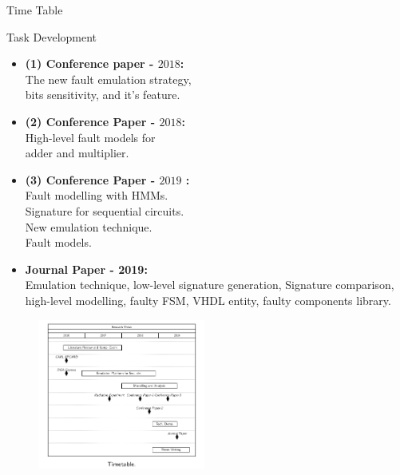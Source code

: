 \documentclass[aspectratio=1610]{beamer}
\begin{document}
\begin{frame}{Time Table}
\vspace{-0.5cm}
\begin{block}{Task Development}
\end{block}


\begin{itemize}
\vspace{-0.5cm}
\item \textbf{(1) Conference paper - $2018$:} \\
The new fault emulation strategy,\\bits sensitivity, and it's feature.

\item \textbf{(2) Conference Paper - $2018$:} \\

High-level fault models for \\adder and multiplier.
\item \textbf{(3) Conference Paper - $2019$ :} \\

Fault modelling with HMMs. \\
Signature for sequential circuits. \\ New emulation technique.\\
Fault models.

\vspace{0.35cm}

\item \textbf{Journal Paper - 2019:} \\
Emulation technique, low-level signature generation, Signature comparison, high-level modelling, faulty FSM, VHDL entity, faulty components library.

\end{itemize}






\vspace{-7.7cm}

\begin{figure}[tb!]
 \centering
  \captionsetup{justification=centering}    
   \includegraphics[width=0.49\textwidth, right]{Figures/time-table.png}
   

\end{figure}
\end{frame}
\end{document}
